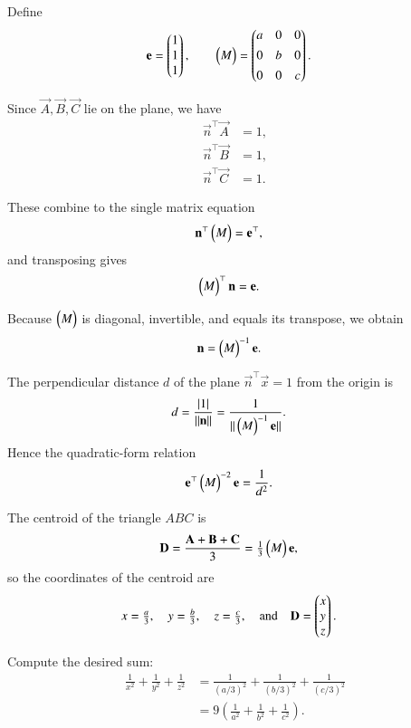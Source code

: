 \documentclass[journal]{IEEEtran}
\begin{document}
Define
\begin{align}
\mathbf{e} &= \begin{pmatrix}1\\1\\1\end{pmatrix}, \qquad 
\begin{pmatrix}M\end{pmatrix} = \begin{pmatrix}a&0&0\\[4pt]0&b&0\\[4pt]0&0&c\end{pmatrix}.
\end{align}

Since $\vec{A},\vec{B},\vec{C}$ lie on the plane, we have
\begin{align}
\vec{n}^\top \vec{A} &= 1, \\[4pt]
\vec{n}^\top \vec{B} &= 1, \\[4pt]
\vec{n}^\top \vec{C} &= 1.
\end{align}

These combine to the single matrix equation
\begin{align}
\mathbf{n}^\top \begin{pmatrix}M\end{pmatrix} &= \mathbf{e}^\top,
\end{align}
and transposing gives
\begin{align}
\begin{pmatrix}M\end{pmatrix}^\top \mathbf{n} &= \mathbf{e}.
\end{align}

Because \(\begin{pmatrix}M\end{pmatrix}\) is diagonal, invertible, and equals its transpose, we obtain
\begin{align}
\mathbf{n} &= \begin{pmatrix}M\end{pmatrix}^{-1}\mathbf{e}.
\end{align}

The perpendicular distance \(d\) of the plane \(\vec{n}^\top \vec{x}=1\) from the origin is
\begin{align}
d &= \frac{|1|}{\|\mathbf{n}\|}
= \frac{1}{\|\begin{pmatrix}M\end{pmatrix}^{-1}\mathbf{e}\|}.
\end{align}
Hence the quadratic-form relation
\begin{align}
\mathbf{e}^\top \begin{pmatrix}M\end{pmatrix}^{-2} \mathbf{e} &= \frac{1}{d^2}.
\end{align}

The centroid of the triangle \(ABC\) is
\begin{align}
\mathbf{D} &= \frac{\mathbf{A}+\mathbf{B}+\mathbf{C}}{3}
= \tfrac{1}{3}\begin{pmatrix}M\end{pmatrix}\mathbf{e},
\end{align}
so the coordinates of the centroid are
\begin{align}
x &= \tfrac{a}{3}, \quad y=\tfrac{b}{3}, \quad z=\tfrac{c}{3},
\quad\text{and}\quad \mathbf{D}=\begin{pmatrix}x\\y\\z\end{pmatrix}.
\end{align}

Compute the desired sum:
\begin{align}
\frac{1}{x^2}+\frac{1}{y^2}+\frac{1}{z^2}
&= \frac{1}{(a/3)^2}+\frac{1}{(b/3)^2}+\frac{1}{(c/3)^2} \\
&= 9\!\left(\frac{1}{a^2}+\frac{1}{b^2}+\frac{1}{c^2}\right).
\end{align}
\end{document}

